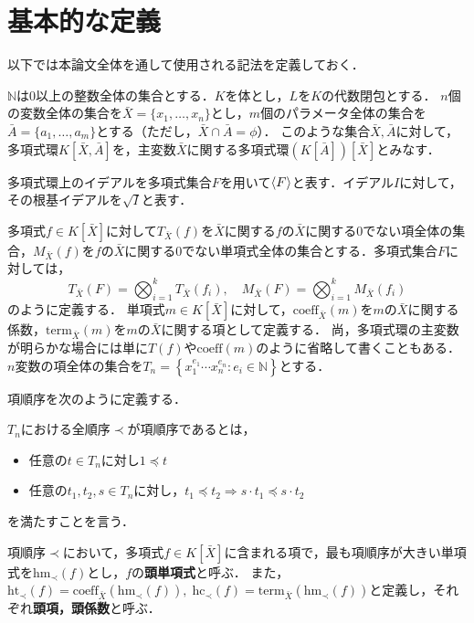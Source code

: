 \section{基本的な定義}
以下では本論文全体を通して使用される記法を定義しておく．
\par
$\mathbb{N}$は$0$以上の整数全体の集合とする．$K$を体とし，$L$を$K$の代数閉包とする．
$n$個の変数全体の集合を$\bar{X} = \{x_1, \dots, x_n\}$とし，$m$個のパラメータ全体の集合を$\bar{A} = \{a_1, \dots, a_m\}$とする（ただし，$\bar{X}\cap \bar{A} = \phi$）．
このような集合$\bar{X}, \bar{A}$に対して，多項式環$K[\bar{X}, \bar{A}]$を，主変数$\bar{X}$に関する多項式環$(K[\bar{A}])[\bar{X}]$とみなす．
\par
多項式環上のイデアルを多項式集合$F$を用いて$\langle F \rangle$と表す．イデアル$I$に対して，その根基イデアルを$\sqrt{I}$と表す．
\par
多項式$f \in K[\bar{X}]$に対して$T_{\bar{X}}(f)$を$\bar{X}$に関する$f$の$\bar{X}$に関する$0$でない項全体の集合，$M_{\bar{X}}(f)$を$f$の$\bar{X}$に関する$0$でない単項式全体の集合とする．多項式集合$F$に対しては，
$$\displaystyle T_{\bar{X}}(F) = \bigotimes_{i=1}^k T_{\bar{X}}(f_i), \quad M_{\bar{X}}(F) = \bigotimes_{i=1}^k M_{\bar{X}}(f_i)$$
のように定義する．
単項式$m \in K[\bar{X}]$に対して，$\mathrm{coeff}_{\bar{X}}(m)$を$m$の$\bar{X}$に関する係数，$\mathrm{term}_{\bar{X}}(m)$を$m$の$\bar{X}$に関する項として定義する．
尚，多項式環の主変数が明らかな場合には単に$T(f)$や$\mathrm{coeff}(m)$のように省略して書くこともある．
$n$変数の項全体の集合を$T_n = \left\{ x_1^{e_1} \cdots x_n^{e_n} : e_i \in \mathbb{N} \right\}$とする．
\par
項順序を次のように定義する．
\begin{definition}[項順序]
	$T_n$における全順序$\prec$が項順序であるとは，
	\begin{itemize}
		\item 任意の$t \in T_n$に対し$1 \preceq t$
		\item 任意の$t_1, t_2, s \in T_n$に対し，$t_1 \preceq t_2 \Longrightarrow s\cdot t_1 \preceq s\cdot t_2$
	\end{itemize}
	を満たすことを言う．
\end{definition}
項順序$\prec$において，多項式$f\in K[\bar{X}]$に含まれる項で，最も項順序が大きい単項式を$\mathrm{hm}_{\prec}(f)$とし，$f$の\textbf{頭単項式}と呼ぶ．
また，
$\mathrm{ht}_{\prec}(f) = \mathrm{coeff}_{\bar{X}}(\mathrm{hm}_{\prec}(f)), \; \mathrm{hc}_{\prec}(f) = \mathrm{term}_{\bar{X}}(\mathrm{hm}_{\prec}(f))$と定義し，それぞれ\textbf{頭項，頭係数}と呼ぶ．
